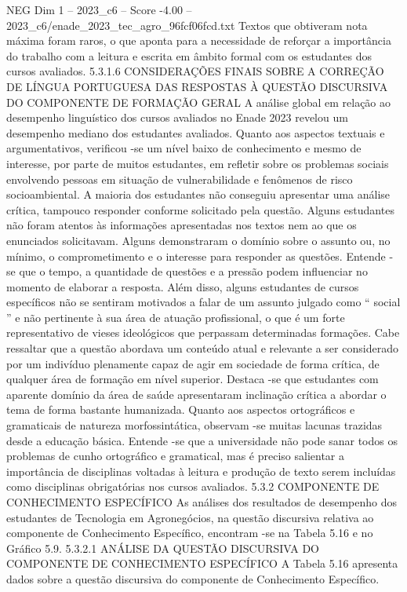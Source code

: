 \begin{textsample}{NEG Dim 1 – 2023\_c6 – Score -4.00 – 2023\_c6/enade\_2023\_tec\_agro\_96fcf06fcd.txt}
Textos que obtiveram nota máxima foram raros, o que aponta para a necessidade de reforçar a importância do trabalho com a leitura e escrita em âmbito formal com os estudantes dos cursos avaliados. 5.3.1.6 CONSIDERAÇÕES FINAIS SOBRE A CORREÇÃO DE LÍNGUA PORTUGUESA DAS RESPOSTAS À QUESTÃO DISCURSIVA DO COMPONENTE DE FORMAÇÃO GERAL A análise global em relação ao desempenho linguístico dos cursos avaliados no Enade 2023 revelou um desempenho mediano dos estudantes avaliados.
Quanto aos aspectos textuais e argumentativos, verificou -se um nível baixo de conhecimento e mesmo de interesse, por parte de muitos estudantes, em refletir sobre os problemas sociais envolvendo pessoas em situação de vulnerabilidade e fenômenos de risco socioambiental.
A maioria dos estudantes não conseguiu apresentar uma análise crítica, tampouco responder conforme solicitado pela questão.
Alguns estudantes não foram atentos às informações apresentadas nos textos nem ao que os enunciados solicitavam.
Alguns demonstraram o domínio sobre o assunto ou, no mínimo, o comprometimento e o interesse para responder as questões.
Entende -se que o tempo, a quantidade de questões e a pressão podem influenciar no momento de elaborar a resposta.
Além disso, alguns estudantes de cursos específicos não se sentiram motivados a falar de um assunto julgado como “ social ” e não pertinente à sua área de atuação profissional, o que é um forte representativo de vieses ideológicos que perpassam determinadas formações.
Cabe ressaltar que a questão abordava um conteúdo atual e relevante a ser considerado por um indivíduo plenamente capaz de agir em sociedade de forma crítica, de qualquer área de formação em nível superior.
Destaca -se que estudantes com aparente domínio da área de saúde apresentaram inclinação crítica a abordar o tema de forma bastante humanizada.
Quanto aos aspectos ortográficos e gramaticais de natureza morfossintática, observam -se muitas lacunas trazidas desde a educação básica.
Entende -se que a universidade não pode sanar todos os problemas de cunho ortográfico e gramatical, mas é preciso salientar a importância de disciplinas voltadas à leitura e produção de texto serem incluídas como disciplinas obrigatórias nos cursos avaliados. 5.3.2 COMPONENTE DE CONHECIMENTO ESPECÍFICO As análises dos resultados de desempenho dos estudantes de Tecnologia em Agronegócios, na questão discursiva relativa ao componente de Conhecimento Específico, encontram -se na Tabela 5.16 e no Gráfico 5.9. 5.3.2.1 ANÁLISE DA QUESTÃO DISCURSIVA DO COMPONENTE DE CONHECIMENTO ESPECÍFICO A Tabela 5.16 apresenta dados sobre a questão discursiva do componente de Conhecimento Específico.

\end{textsample}
